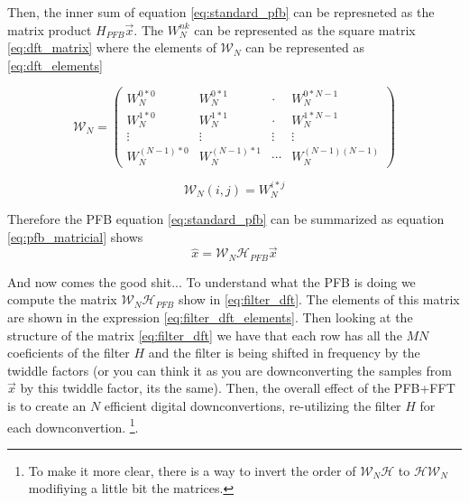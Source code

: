 Then, the inner sum of equation \ref{eq:standard_pfb} can be represneted as the matrix product $H_{PFB}\vec{x}$. The $W_{N}^{nk}$ can be represented as the square matrix \ref{eq:dft_matrix} where the elements of $\mathcal{W}_N$ can be represented as \ref{eq:dft_elements}

\begin{equation}
    \label{eq:dft_matrix}
    \mathcal{W}_N = 
    \begin{pmatrix}
        W_{N}^{0*0}     & W_{N}^{0*1}       & \cdot  & W_{N}^{0*N-1} \\
        W_{N}^{1*0}     & W_{N}^{1*1}       & \cdot  & W_{N}^{1*N-1} \\
        \vdots          & \vdots            & \vdots & \vdots        \\
        W_{N}^{(N-1)*0} & W_{N}^{(N-1)*1}   & \cdots & W_{N}^{(N-1)(N-1)}
    \end{pmatrix}
\end{equation}

\begin{equation}
    \label{eq:dft_elements}
    \mathcal{W}_{N}(i,j) = W_{N}^{i*j}
\end{equation}

Therefore the PFB equation \ref{eq:standard_pfb} can be summarized as equation \ref{eq:pfb_matricial} shows
\begin{equation}
    \label{eq:pfb_matricial}
    \hat{x} = \mathcal{W}_N \mathcal{H}_{PFB} \vec{x}
\end{equation}


And now comes the good shit... To understand what the PFB is doing we compute the matrix $\mathcal{W}_N \mathcal{H}_{PFB}$ show in \ref{eq:filter_dft}.
The elements of this matrix are shown in the expression \ref{eq:filter_dft_elements}. Then looking at the structure of the matrix \ref{eq:filter_dft} we have that each row has all the $MN$ coeficients of the filter $H$ and the filter is being shifted in frequency by the twiddle factors (or you can think it as you are downconverting the samples from $\vec{x}$ by this twiddle factor, its the same). Then, the overall effect of the PFB+FFT is to create an $N$ efficient digital downconvertions, re-utilizing the filter $H$ for each downconvertion. \footnote{To make it more clear, there is a way to invert the order of $\mathcal{W}_N\mathcal{H}$ to $\mathcal{H}\mathcal{W}_N$ modifiying a little bit the matrices.}.

